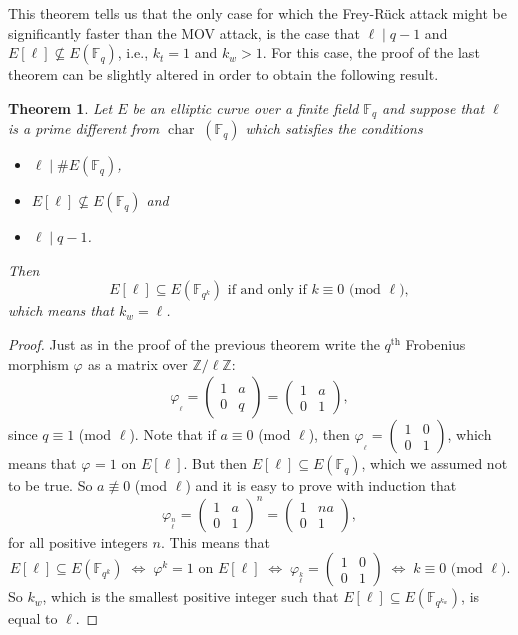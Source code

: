 \documentclass{article}
\numberwithin{equation}{section}
\newtheorem{theorem}{Theorem}[subsection]
\theoremstyle{definition}
\newcommand{\ZZ}{{\mathbb Z}} %
\newcommand{\Zmod}[1]{\ZZ / #1\ZZ} %
\newcommand{\FF}[1]{{\mathbb F}_{#1}} %
\newcommand{\frob}[1][]{\varphi_{#1}} %
\begin{document}
This theorem tells us that the only case for which the Frey-R\"uck attack might be significantly faster than the MOV attack, is the case that $\ell \mid q-1$ and $E[\ell] \not \subseteq E(\FF{q})$, i.e., $k_t=1$ and $k_w>1$.  For this case, the proof of the last theorem can be slightly altered in order to obtain the following result. 

\begin{theorem}\label{freyrucklasttheorem}
Let $E$ be an elliptic curve over a finite field $\FF{q}$ and suppose that $\ell$ is a prime different from $\operatorname{char}\;(\FF{q})$ which satisfies the conditions
\begin{itemize}
\item $\ell \mid \#E(\FF{q})$, 
\item $E[\ell] \not \subseteq E(\FF{q})$ and 
\item$\ell \mid q-1$.
\end{itemize}
Then $$E[\ell] \subseteq E(\FF{q^k}) \text{ if and only if } k \equiv 0 \text{ (mod }\ell),$$ which means that $k_w=\ell$.
\end{theorem}

\begin{proof}

Just as in the proof of the previous theorem write the $q^\text{th}$ Frobenius morphism $\frob$ as a matrix over $\Zmod{\ell}$: $$\frob_\ell = \begin{pmatrix} 1 & a \\ 0 & q \end{pmatrix} = \begin{pmatrix} 1 & a \\ 0 & 1 \end{pmatrix},$$ since $q \equiv 1$ (mod $\ell$). Note that if $a \equiv 0$ (mod $\ell$), then $\frob_\ell=\begin{pmatrix} 1 & 0 \\ 0 & 1 \end{pmatrix}$, which means that $\frob=1$ on $E[\ell]$. But then $E[\ell] \subseteq E(\FF{q})$, which we assumed not to be true. So $a \not \equiv 0$ (mod $\ell$) and it is easy to prove with induction that $$\frob_\ell^n = \begin{pmatrix} 1 & a \\ 0 & 1 \end{pmatrix}^n = \begin{pmatrix} 1 & na \\ 0 & 1 \end{pmatrix},$$ for all positive integers $n$. This means that $$E[\ell] \subseteq E(\FF{q^k}) \;\Longleftrightarrow\; \frob^k = 1 \text{ on } E[\ell] \;\Longleftrightarrow\; \frob_\ell^k = \begin{pmatrix} 1 & 0 \\ 0 & 1 \end{pmatrix}\; \Longleftrightarrow\; k \equiv 0 \text{ (mod } \ell).$$ So $k_w$, which is the smallest positive integer such that $E[\ell] \subseteq E(\FF{q^{k_w}})$, is equal to $\ell$. 
\end{proof}
\end{document}
